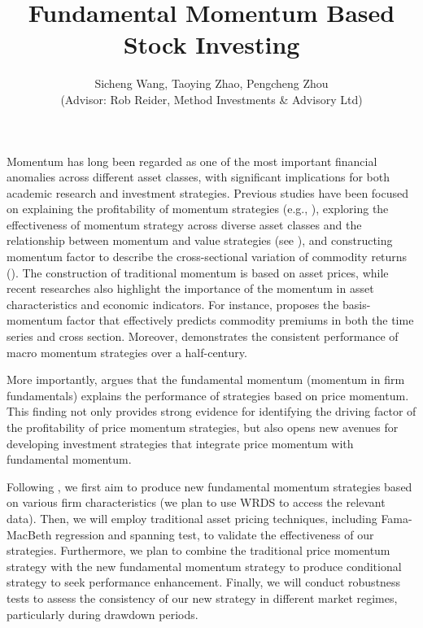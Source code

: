 \documentclass[12pt]{article}
\title{\textbf{Fundamental Momentum Based \\ Stock Investing}}
\author{
	 Sicheng Wang, Taoying Zhao, Pengcheng Zhou \\
	 (Advisor: Rob Reider, Method Investments \& Advisory Ltd)
	}
\begin{document}
	\maketitle

	Momentum has long been regarded as one of the most important financial anomalies across different asset classes, with significant implications for both academic research and investment strategies.
	Previous studies have been focused on explaining the profitability of momentum strategies (e.g., \cite{chan1996momentum}),
	 exploring the effectiveness of momentum strategy across diverse asset classes and the relationship between momentum and value strategies (see \cite{asness2013value}), 
	 and constructing momentum factor to describe the cross-sectional variation of commodity returns (\cite{bakshi2019understanding}).
	 The construction of traditional momentum is based on asset prices, while recent researches also highlight the importance of the momentum in asset characteristics and economic indicators.
	 For instance, \textcite{boons2019basis} proposes the basis-momentum factor that effectively predicts commodity premiums in both the time
	  series and cross section. Moreover, \textcite{brooks2017half} demonstrates the consistent performance of macro momentum strategies over a half-century.
	
	More importantly, \textcite{NBERw20984} argues that the fundamental momentum (momentum in firm fundamentals) explains the performance of strategies based on 
	price momentum. This finding not only provides strong evidence for identifying the driving factor of the profitability of price momentum strategies, 
	but also opens new avenues for developing investment strategies that integrate price momentum with fundamental momentum.

	Following \textcite{NBERw20984}, we first aim to produce new fundamental momentum strategies based on various firm characteristics (we plan to use WRDS to access the relevant data). 
	Then, we will employ traditional asset pricing techniques, including Fama-MacBeth regression and spanning test,
	 to validate the effectiveness of our strategies. Furthermore, we plan to combine the traditional price momentum strategy with the new fundamental momentum strategy to produce conditional strategy to seek performance enhancement.
	  Finally, we will conduct robustness tests to assess the consistency of our new strategy in different market regimes, particularly during drawdown periods.


	\newpage
	\printbibliography
\end{document}
